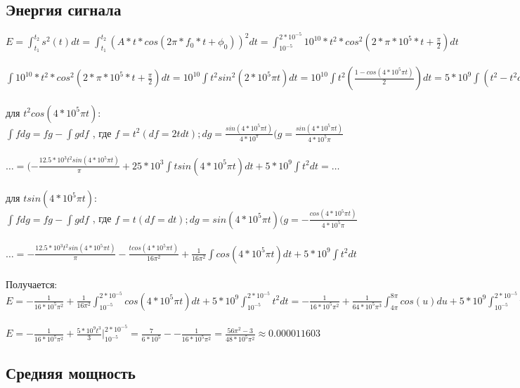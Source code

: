 \documentclass[12pt]{article}
\begin{document}
  \subsection*{Энергия сигнала}
 $E = \int_{t_1}^{t_2} s^2(t)dt = \int_{t_1}^{t_2} (A*t*cos(2\pi*f_0*t + \phi_0))^2dt = \int_{10^{-5}}^{2*10^{-5}} 10^{10} * t^2 * cos^2(2 * \pi * 10^5 * t + \frac{\pi}{2}) dt$\\
 \\
 $\int 10^{10} * t^2 * cos^2(2 * \pi * 10^5 * t + \frac{\pi}{2}) dt = 10^{10} \int t^2 sin^2(2*10^5\pi t)dt = 10^{10} \int t^2(\frac{1 - cos(4*10^5\pi t)}{2})dt = 5*10^9 \int (t^2 - t^2cos(4*10^5\pi t))dt = 5*10^9 * (\int t^2dt - \int t^2*cos(4*10^5\pi t)dt) =\dots$\\
 \\
 для $t^2 cos(4*10^5\pi t)$:\\
 $\int fdg = fg - \int gdf$ , где $ f = t^2 (df = 2tdt); dg = \frac{sin(4*10^5\pi t)}{4*10^\pi} (g = \frac{sin(4*10^5\pi t)}{4*10^5\pi}$\\
 \\
 $\dots= (-\frac{12.5*10^3 t^2 sin(4*10^5\pi t)}{\pi} +  25*10^3 \int tsin(4*10^5\pi t)dt + 5*10^9 \int t^2dt =\dots$\\
 \\
  для $t sin(4*10^5\pi t)$:\\
 $\int fdg = fg - \int gdf$ , где $ f = t (df = dt); dg = sin(4*10^5\pi t) (g = -\frac{cos(4*10^5\pi t)}{4*10^5\pi}$\\
 \\
 $\dots= -\frac{12.5*10^3 t^2 sin(4*10^5\pi t)}{\pi} - \frac{tcos(4*10^5\pi t)}{16\pi^2} + \frac{1}{16\pi^2} \int cos(4*10^5\pi t)dt + 5*10^9 \int t^2dt$\\
 \\Получается:
 \\
 $E = -\frac{1}{16*10^5\pi^2} + \frac{1}{16\pi^2}\int_{10^{-5}}^{2*10^{-5}} cos(4*10^5\pi t)dt + 5*10^9 \int_{10^{-5}}^{2*10^{-5}} t^2dt = -\frac{1}{16*10^5\pi^2} + \frac{1}{64*10^5\pi^3} \int_{4\pi}^{8\pi} cos(u)du + 5*10^9 \int_{10^{-5}}^{2*10^{-5}} t^2dt$ \\
 \\
 $E = -\frac{1}{16*10^5\pi^2} + \frac{5*10^9t^3}{3} |_{10^{-5}}^{2*10^{-5}} = \frac{7}{6*10^5} - -\frac{1}{16*10^5\pi^2} = \frac{56\pi^2 - 3}{48*10^5\pi^2} \approx 0.000011603$
 
 \subsection*{Средняя мощность}
 
\end{document}
